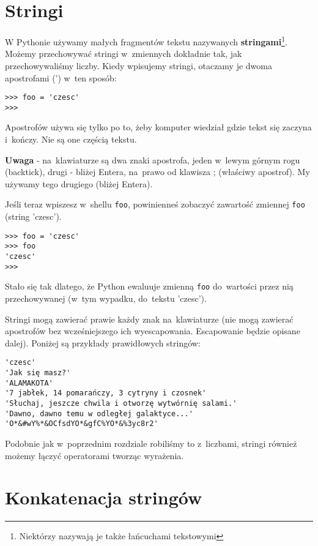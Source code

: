 \documentclass{book}
\begin{document}
\section{Stringi}

W Pythonie używamy małych fragmentów tekstu nazywanych {\bf stringami}\footnote{Niektórzy nazywają je także łańcuchami tekstowymi}. Możemy przechowywać stringi w~zmiennych dokładnie tak, jak przechowywaliśmy liczby. Kiedy wpisujemy stringi, otaczamy je dwoma apostrofami (') w~ten sposób:

\begin{lstlisting}
>>> foo = 'czesc'
>>>
\end{lstlisting}

Apostrofów używa się tylko po to, żeby komputer wiedział gdzie tekst się zaczyna i~kończy. Nie są one częścią tekstu.

{\bf Uwaga} - na~klawiaturze są dwa znaki apostrofa, jeden w~lewym górnym rogu (backtick), drugi - bliżej Entera, na~prawo od klawisza ; (właściwy apostrof). My używamy tego drugiego (bliżej Entera).

Jeśli teraz wpiszesz w~shellu \lstinline{foo}, powinienneś zobaczyć zawartość zmiennej \lstinline{foo} (string 'czesc'). 


\begin{lstlisting}
>>> foo = 'czesc'
>>> foo
'czesc'
>>>
\end{lstlisting}

Stało się tak dlatego, że Python ewaluuje zmienną \lstinline{foo} do~wartości przez nią przechowywanej (w~tym wypadku, do~tekstu 'czesc').

Stringi mogą zawierać prawie każdy znak na~klawiaturze (nie mogą zawierać apostrofów bez wcześniejszego ich wyescapowania. Escapowanie będzie opisane dalej). Poniżej są przykłady prawidłowych stringów:

\begin{lstlisting}
'czesc'
'Jak się masz?'
'ALAMAKOTA'
'7 jabłek, 14 pomarańczy, 3 cytryny i czosnek'
'Słuchaj, jeszcze chwila i otworzę wytwórnię salami.'
'Dawno, dawno temu w odległej galaktyce...'
'O*&#wY%*&OCfsdYO*&gfC%YO*&%3yc8r2'
\end{lstlisting}

Podobnie jak w~poprzednim rozdziale robiliśmy to z~liczbami, stringi również możemy łączyć operatorami tworząc wyrażenia.

\section{Konkatenacja stringów}
\end{document}
